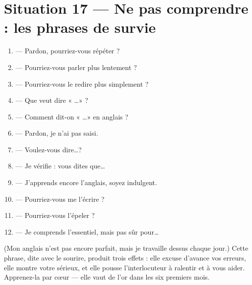 \section{Situation 17 --- Ne pas comprendre : les phrases de survie}
\begin{memo}
\begin{enumerate}
  \item {} --- Pardon, pourriez-vous répéter ?
  \item {} --- Pourriez-vous parler plus lentement ?
  \item {} --- Pourriez-vous le redire plus simplement ?
  \item {} --- Que veut dire « \ldots » ?
  \item {} --- Comment dit-on « \ldots » en anglais ?
  \item {} --- Pardon, je n'ai pas saisi.
  \item {} --- Voulez-vous dire\ldots ?
  \item {} --- Je vérifie : vous dites que\ldots
  \item {} --- J'apprends encore l'anglais, soyez indulgent.
  \item {} --- Pourriez-vous me l'écrire ?
  \item {} --- Pourriez-vous l'épeler ?
  \item {} --- Je comprends l'essentiel, mais pas sûr pour\ldots
\end{enumerate}
\end{memo}

\begin{astuce}
(Mon anglais n'est pas encore parfait, mais je travaille dessus chaque jour.)
Cette phrase, dite avec le sourire, produit trois effets : elle excuse d'avance vos erreurs,
elle montre votre sérieux, et elle pousse l'interlocuteur à ralentir et à vous aider.
Apprenez-la par c\oe ur --- elle vaut de l'or dans les six premiers mois.
\end{astuce}

